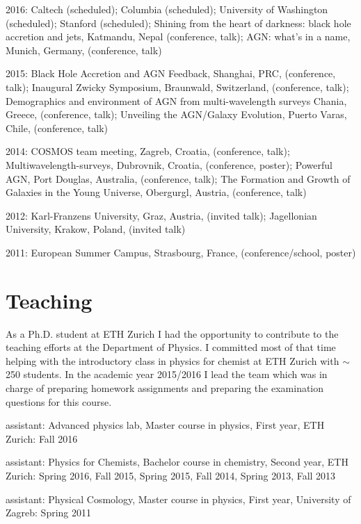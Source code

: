 \documentclass[11pt,letterpaper]{article}
\renewenvironment{itemize}{
  \begin{list}{}{
    \setlength{\leftmargin}{1.5em}
    \setlength{\itemsep}{0.15em}
    \setlength{\parskip}{0pt}
    \setlength{\parsep}{0.25em}
  }
}{
  \end{list}
}
\begin{document}
\begin{itemize}
\item 2016: Caltech (scheduled); Columbia (scheduled); University of Washington (scheduled); Stanford (scheduled); Shining from the heart of darkness: black hole accretion and jets, Katmandu, Nepal (conference, talk); AGN: what's in a name, Munich, Germany, (conference, talk)
\item 2015:
Black Hole Accretion and AGN Feedback, Shanghai, PRC, (conference, talk); Inaugural Zwicky Symposium, Braunwald, Switzerland, (conference, talk); Demographics and environment of AGN from multi-wavelength surveys Chania, Greece, (conference, talk); Unveiling the AGN/Galaxy Evolution, Puerto Varas, Chile, (conference, talk)
\item 2014:
COSMOS team meeting, Zagreb, Croatia, (conference, talk); Multiwavelength-surveys, Dubrovnik, Croatia, (conference, poster); Powerful AGN, Port Douglas, Australia, (conference, talk); The Formation and
Growth of Galaxies in the Young Universe, Obergurgl, Austria, (conference, talk)
\item 2012:
Karl-Franzens University, Graz, Austria, (invited talk); Jagellonian University, Krakow, Poland, (invited talk)
\item 2011:
European Summer Campus, Strasbourg, France, (conference/school, poster)
\end{itemize}


\section*{Teaching}
As a Ph.D. student at ETH Zurich I had the opportunity to contribute to the teaching
efforts at the Department of Physics. I committed most of that time helping with the introductory class in physics for chemist at ETH Zurich with $\sim$ 250 students. In the academic year 2015/2016 I lead the team which was in charge of preparing homework assignments and preparing the examination questions for this course.

\begin{itemize}
\item assistant: Advanced physics lab, Master course in physics, First year, ETH Zurich: Fall 2016
\item assistant: Physics for Chemists, Bachelor course in chemistry, Second year, ETH Zurich: Spring 2016, Fall 2015, Spring 2015, Fall 2014, Spring 2013, Fall 2013
\item assistant: Physical Cosmology, Master course in physics, First year, University of Zagreb: Spring 2011 
\end{itemize}
\end{document}
